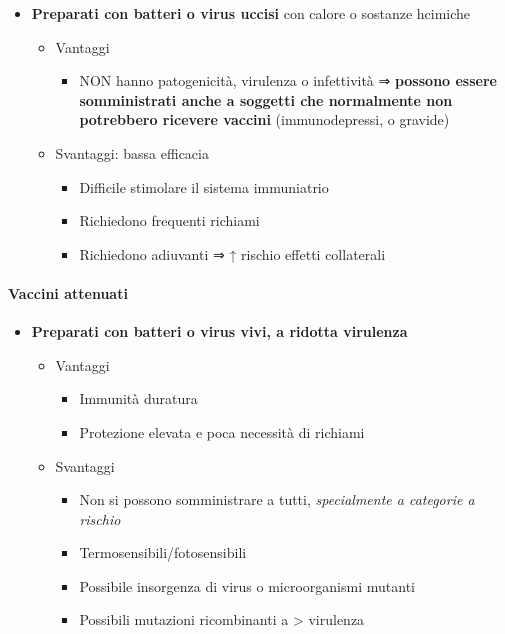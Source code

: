 \documentclass[italian,]{article}
\providecommand{\tightlist}{%
  \setlength{\itemsep}{0pt}\setlength{\parskip}{0pt}}
\begin{document}
\begin{itemize}
\tightlist
\item
  \textbf{Preparati con batteri o virus uccisi} con calore o sostanze
  hcimiche

  \begin{itemize}
  \tightlist
  \item
    Vantaggi

    \begin{itemize}
    \tightlist
    \item
      NON hanno patogenicità, virulenza o infettività ⇒ \textbf{possono
      essere somministrati anche a soggetti che normalmente non
      potrebbero ricevere vaccini} (immunodepressi, o gravide)
    \end{itemize}
  \item
    Svantaggi: bassa efficacia

    \begin{itemize}
    \tightlist
    \item
      Difficile stimolare il sistema immuniatrio
    \item
      Richiedono frequenti richiami
    \item
      Richiedono adiuvanti ⇒ ↑ rischio effetti collaterali
    \end{itemize}
  \end{itemize}
\end{itemize}

\hypertarget{vaccini-attenuati}{%
\paragraph{Vaccini attenuati}\label{vaccini-attenuati}}

\begin{itemize}
\tightlist
\item
  \textbf{Preparati con batteri o virus vivi, a ridotta virulenza}

  \begin{itemize}
  \tightlist
  \item
    Vantaggi

    \begin{itemize}
    \tightlist
    \item
      Immunità duratura
    \item
      Protezione elevata e poca necessità di richiami
    \end{itemize}
  \item
    Svantaggi

    \begin{itemize}
    \tightlist
    \item
      Non si possono somministrare a tutti, \emph{specialmente a
      categorie a rischio}
    \item
      Termosensibili/fotosensibili
    \item
      Possibile insorgenza di virus o microorganismi mutanti
    \item
      Possibili mutazioni ricombinanti a \textgreater{} virulenza
    \end{itemize}
  \end{itemize}
\end{itemize}
\end{document}
